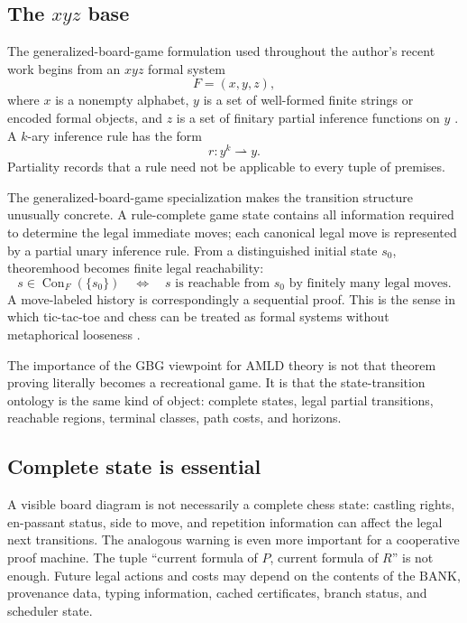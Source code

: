 \documentclass[11pt]{article}
\theoremstyle{remark}
\newcommand{\BANK}{\ensuremath{\mathrm{BANK}}}
\newcommand{\Con}{\operatorname{Con}}
\begin{document}
\subsection{\texorpdfstring{The $xyz$ base}{The xyz base}}

The generalized-board-game formulation used throughout the author's recent work begins from an $xyz$ formal system
\[
F=(x,y,z),
\]
where $x$ is a nonempty alphabet, $y$ is a set of well-formed finite strings or encoded formal objects, and $z$ is a set of finitary partial inference functions on $y$ \cite{TennesonGBG,TennesonDepths48}. A $k$-ary inference rule has the form
\[
r:y^k\rightharpoonup y.
\]
Partiality records that a rule need not be applicable to every tuple of premises.

The generalized-board-game specialization makes the transition structure unusually concrete. A rule-complete game state contains all information required to determine the legal immediate moves; each canonical legal move is represented by a partial unary inference rule. From a distinguished initial state $s_0$, theoremhood becomes finite legal reachability:
\[
s\in \Con_F(\{s_0\})
\quad\Longleftrightarrow\quad
s\text{ is reachable from }s_0\text{ by finitely many legal moves}.
\]
A move-labeled history is correspondingly a sequential proof. This is the sense in which tic-tac-toe and chess can be treated as formal systems without metaphorical looseness \cite{TennesonGBG}.

The importance of the GBG viewpoint for AMLD theory is not that theorem proving literally becomes a recreational game. It is that the state-transition ontology is the same kind of object: complete states, legal partial transitions, reachable regions, terminal classes, path costs, and horizons.

\subsection{Complete state is essential}

A visible board diagram is not necessarily a complete chess state: castling rights, en-passant status, side to move, and repetition information can affect the legal next transitions. The analogous warning is even more important for a cooperative proof machine. The tuple ``current formula of $P$, current formula of $R$'' is not enough. Future legal actions and costs may depend on the contents of the \BANK, provenance data, typing information, cached certificates, branch status, and scheduler state.
\end{document}
